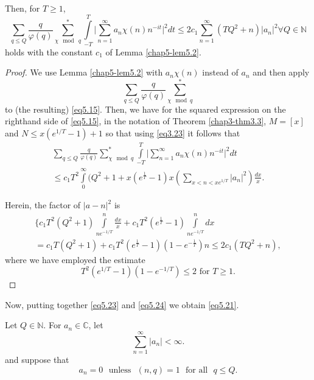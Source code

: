 Then, for $T \geq 1$,
\begin{equation*}
 \sum_{q\leq Q} \frac{q}{\varphi (q)}\sum_{\chi \mod ~ q}^*
 \int\limits_{-T}^{T} \Big| \sum^{\infty}_{n=1}a_n \chi (n)n^{-it}
 \Big|^2 dt \leq 2c_1 \sum_{n=1}^{\infty} (TQ^2 + n) | a_n |^2 \forall Q
 \in \mathbb{N} \tag{5.21}\label{eq5.21} 
\end{equation*}
holds with the constant $c_1$ of Lemma \ref{chap5-lem5.2}.

\begin{proof}
We use Lemma \ref{chap5-lem5.2} with $a_n \chi (n)$ instead of $a_n$
and then apply 
\begin{equation*}
\sum_{q\leq Q}\frac{q}{\varphi (q)} \sum\limits_{\chi \mod q}^*
\tag{5.22}\label{eq5.22} 
\end{equation*}
to (the resulting) \eqref{eq5.15}. Then, we have for the squared
expression on the righthand side of \eqref{eq5.15}, in the notation of
Theorem \ref{chap3-thm3.3}, $M = [x]$ and $N \leq x(e^{1/T}-1)+1$ so
that using \eqref{eq3.23} it follows that 
\begin{gather*}
\sum_{q\leq Q}\frac{q}{\varphi (q)}\sum_{\chi \mod  q}^*
\int\limits_{-T}^T \Big| \sum_{n=1}^{\infty} a_n \chi (n)n^{-it}
\Big|^2 dt\\
 \leq c_1 T^2 \int\limits_0^\infty (Q^2 + 1 +
x(e^{\frac{1}{T}}-1)x (\sum_{x<n<xe^{1/T}} | a_n |^2)
\frac{dx}{x}. \tag{5.23}\label{eq5.23} 
\end{gather*}

Herein, the factor of $| a-n |^2$ is 
\begin{gather*}
\Big\{ c_1 T^2 (Q^2 + 1) \int\limits^n_{ne^{-1/T}} \frac{dx}{x} + c_1
T^2 (e^{\frac{1}{T}}-1)  \int\limits^n_{ne^{-1/T}} dx\\
 = c_1 T(Q^2 + 1)
+ c_1 T^2(e^{\frac{1}{T}}-1)(1-e^{-\frac{1}{T}})n \leq 2c_1 (TQ^2 +
n), \tag{5.24}\label{eq5.24} 
\end{gather*}
where we have employed the estimate
\begin{equation*}
T^2(e^{1/T}-1)(1-e^{-1/T}) \leq 2 \text{ for } T \geq
1. \tag{5.25}\label{eq5.25} 
\end{equation*}
\end{proof}

Now, putting together \eqref{eq5.23} and \eqref{eq5.24} we obtain
\eqref{eq5.21}. 

\begin{theorem}\label{chap5-thm5.2}
Let $Q \in \mathbb{N}$. For $a_n \in \mathbb{C}$, let
\begin{equation*}
\sum_{n=1}^{\infty} | a_n | < \infty. \tag{5.26}\label{eq5.26}
\end{equation*}
and suppose that
\begin{equation*}
a_n = 0  \text{~ unless~ } (n,q) = 1 \text{~ for all~ } q \leq
Q. \tag{5.27}\label{eq5.27} 
\end{equation*}
\end{theorem}

